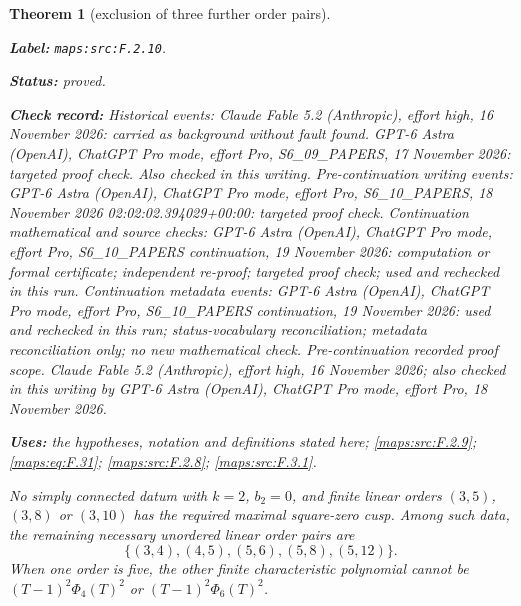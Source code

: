 \documentclass[11pt,a4paper]{article}
\newtheorem{theorem}{Theorem}[section]
\theoremstyle{definition}
\newcommand{\StatementRecord}[4]{\par\smallskip\begingroup\upshape\raggedright\noindent\textbf{Label:} \nolinkurl{#1}.\par\noindent\textbf{Status:} #2.\par\noindent\textbf{Check record:} #3.\par\noindent\textbf{Uses:} #4.\par\endgroup\smallskip}
\begin{document}
\begin{theorem}[exclusion of three further order pairs]\label{maps:src:F.2.10}
\StatementRecord{maps:src:F.2.10}{proved}{Historical events: Claude Fable 5.2 (Anthropic), effort high, 16 November 2026: carried as background without fault found. GPT-6 Astra (OpenAI), ChatGPT Pro mode, effort Pro, S6\_09\_PAPERS, 17 November 2026: targeted proof check. Also checked in this writing. Pre-continuation writing events: GPT-6 Astra (OpenAI), ChatGPT Pro mode, effort Pro, S6\_10\_PAPERS, 18 November 2026 02:02:02.394029+00:00: targeted proof check. Continuation mathematical and source checks: GPT-6 Astra (OpenAI), ChatGPT Pro mode, effort Pro, S6\_10\_PAPERS continuation, 19 November 2026: computation or formal certificate; independent re-proof; targeted proof check; used and rechecked in this run. Continuation metadata events: GPT-6 Astra (OpenAI), ChatGPT Pro mode, effort Pro, S6\_10\_PAPERS continuation, 19 November 2026: used and rechecked in this run; status-vocabulary reconciliation; metadata reconciliation only; no new mathematical check. \emph{Pre-continuation recorded proof scope.} Claude Fable 5.2 (Anthropic), effort high, 16 November 2026; also checked in this writing by GPT-6 Astra (OpenAI), ChatGPT Pro mode, effort Pro, 18 November 2026}{the hypotheses, notation and definitions stated here; \cref{maps:src:F.2.9}; \cref{maps:eq:F.31}; \cref{maps:src:F.2.8}; \cref{maps:src:F.3.1}}


No simply connected datum with $k=2$, $b_2=0$, and finite linear orders
$(3,5)$, $(3,8)$ or $(3,10)$ has the required maximal
square-zero cusp.  Among such data, the
remaining necessary unordered linear order pairs are
\[
 \{(3,4),(4,5),(5,6),(5,8),(5,12)\}.
 \tag{F.30}\label{maps:eq:F.30}
\]
When one order is five, the other finite characteristic
polynomial cannot be $(T-1)^2\Phi_4(T)^2$ or
$(T-1)^2\Phi_6(T)^2$.

\end{theorem}
\end{document}
